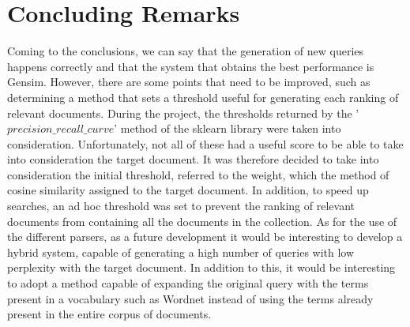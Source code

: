\section*{Concluding Remarks}
Coming to the conclusions, we can say that the generation of new queries 
happens correctly and that the system that obtains the best performance 
is Gensim. However, there are some points that need to be improved, such 
as determining a method that sets a threshold useful for generating each 
ranking of relevant documents. During the project, the thresholds returned 
by the '$precision\_recall\_curve$' method of the sklearn library were taken into 
consideration. Unfortunately, not all of these had a useful score to be able 
to take into consideration the target document. It was therefore decided to 
take into consideration the initial threshold, referred to the weight, which the 
method of cosine similarity assigned to the target document. In addition, to 
speed up searches, an ad hoc threshold was set to prevent the ranking of 
relevant documents from containing all the documents in the collection. As 
for the use of the different parsers, as a future development it would be 
interesting to develop a hybrid system, capable of generating a high number 
of queries with low perplexity with the target document. In addition to this, 
it would be interesting to adopt a method capable of expanding the original 
query with the terms present in a vocabulary such as Wordnet instead of 
using the terms already present in the entire corpus of documents.